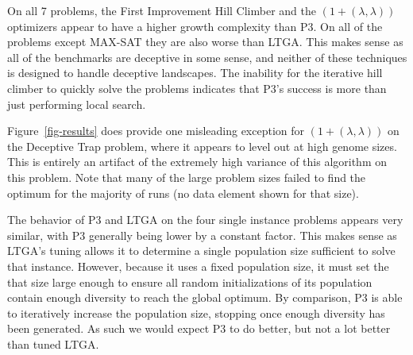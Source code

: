 \documentclass{sig-alternate}
\begin{document}
On all 7 problems, the First Improvement Hill Climber and the $(1+(\lambda,\lambda))$
optimizers appear to have a higher growth complexity than P3.  On all of the problems
except MAX-SAT they are also worse than LTGA.  This makes sense as all of the
benchmarks are deceptive in some sense, and neither of these techniques is designed
to handle deceptive landscapes.  The inability for the iterative hill climber to quickly solve
the problems indicates that P3's success is more than just performing local search.

Figure~\ref{fig-results} does provide one misleading
exception for $(1+(\lambda,\lambda))$ on the Deceptive Trap problem, where it appears to
level out at high genome sizes.  This is entirely an artifact of the extremely high
variance of this algorithm on this problem.  Note that many of the large problem
sizes failed to find the optimum for the majority of runs (no data element shown for that size).

The behavior of P3 and LTGA on the four single instance problems appears very similar,
with P3 generally being lower by a constant factor.  This makes sense as LTGA's
tuning allows it to determine a single population size sufficient to solve that
instance.  However, because it uses a fixed population size, it must set the that
size large enough to ensure all random initializations of its population
contain enough diversity to reach the global optimum.  By comparison, P3 is able to
iteratively increase the population size, stopping once enough diversity has been generated.
As such we would expect P3 to do better, but not a lot better than tuned LTGA.
\end{document}
